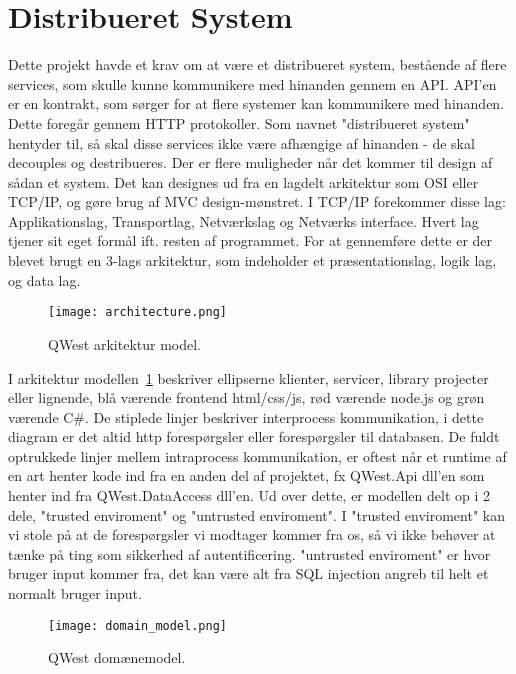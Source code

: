 \section{Distribueret System}\label{sec:distSys}
Dette projekt havde et krav om at være et distribueret system, bestående af flere services, som skulle kunne kommunikere med hinanden gennem en API. API'en er en kontrakt, som sørger for at flere systemer kan kommunikere med hinanden\cite{API}. Dette foregår gennem HTTP protokoller\cite{http}.
Som navnet "distribueret system" hentyder til, så skal disse services ikke være afhængige af hinanden - de skal decouples\cite{decoupling} og destribueres. Der er flere muligheder når det kommer til design af sådan et system. Det kan designes ud fra en lagdelt arkitektur som OSI eller TCP/IP\cite{osi_tcp}, og gøre brug af MVC design-mønstret. I TCP/IP forekommer disse lag: Applikationslag, Transportlag, Netværkslag og Netværks interface.
Hvert lag tjener sit eget formål ift. resten af programmet.
For at gennemføre dette er der blevet brugt en 3-lags arkitektur, som indeholder et præsentationslag, logik lag, og data lag.

\begin{figure}
    \texttt{[image: architecture.png]}
    \caption{QWest arkitektur model.}
    \label{fig:architecture_model}
\end{figure}

I arkitektur modellen~\ref{fig:architecture_model} beskriver ellipserne klienter, servicer, library projecter eller lignende, blå værende frontend html/css/js, rød værende node.js\cite{nodejs} og grøn værende C\#.
De stiplede linjer beskriver interprocess kommunikation, i dette diagram er det altid http forespørgsler eller forespørgsler til databasen.
De fuldt optrukkede linjer mellem intraprocess kommunikation, er oftest når et runtime af en art henter kode ind fra en anden del af projektet, fx QWest.Api dll'en som henter ind fra QWest.DataAccess dll'en.
Ud over dette, er modellen delt op i 2 dele, "trusted enviroment" og "untrusted enviroment". I "trusted enviroment" kan vi stole på at de forespørgsler vi modtager kommer fra os, så vi ikke behøver at tænke på ting som sikkerhed af autentificering. "untrusted enviroment" er hvor bruger input kommer fra, det kan være alt fra SQL injection angreb til helt et normalt bruger input.

\begin{figure}
    \texttt{[image: domain\_model.png]}
    \caption{QWest domænemodel.}
    \label{fig:domain_model}
\end{figure}

